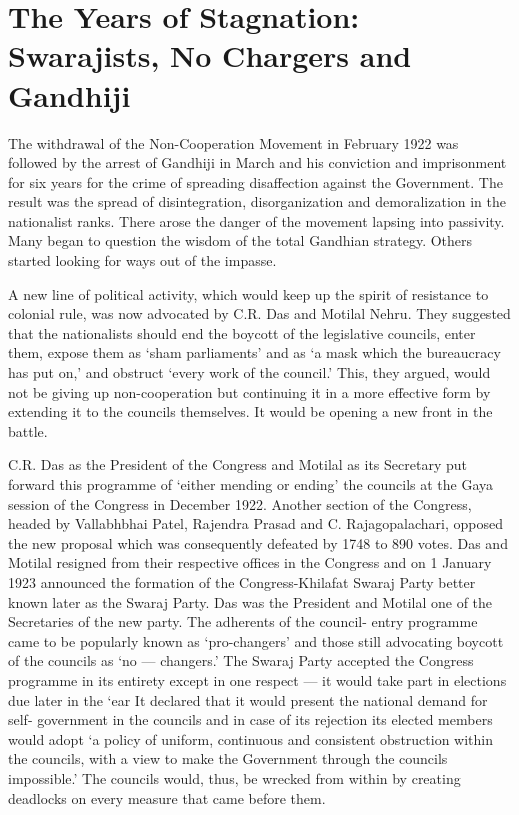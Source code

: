 \chapter[The Years of Stagnation]{The Years of Stagnation: Swarajists, No Chargers and Gandhiji}



The withdrawal of the Non-Cooperation Movement in February 1922 was followed by the arrest of Gandhiji in March and his conviction and imprisonment for six years for the crime of spreading disaffection against the Government. The result was the spread of disintegration, disorganization and demoralization in the nationalist ranks. There arose the danger of the movement lapsing into passivity. Many began to question the wisdom of the total Gandhian strategy. Others started looking for ways out of the impasse.

A new line of political activity, which would keep up the spirit of resistance to colonial rule, was now advocated by C.R. Das and Motilal Nehru. They suggested that the nationalists should end the boycott of the legislative councils, enter them, expose them as `sham parliaments' and as `a mask which the bureaucracy has put on,' and obstruct `every work of the council.' This, they argued, would not be giving up non-cooperation but continuing it in a more effective form by extending it to the councils themselves. It would be opening a new front in the battle.

C.R. Das as the President of the Congress and Motilal as its Secretary put forward this programme of `either mending or ending' the councils at the Gaya session of the Congress in December 1922. Another section of the Congress, headed by Vallabhbhai Patel, Rajendra Prasad and C. Rajagopalachari, opposed the new proposal which was consequently defeated by 1748 to 890 votes. Das and Motilal resigned from their respective offices in the Congress and on 1 January 1923 announced the formation of the Congress-Khilafat Swaraj Party better known later as the Swaraj Party. Das was the President and Motilal one of the Secretaries of the new party. The adherents of the council- entry programme came to be popularly known as `pro-changers' and those still advocating boycott of the councils as `no --- changers.' The Swaraj Party accepted the Congress programme in its entirety except in one respect --- it would take part in elections due later in the `ear It declared that it would present the national demand for self- government in the councils and in case of its rejection its elected members would adopt `a policy of uniform, continuous and consistent obstruction within the councils, with a view to make the Government through the councils impossible.' The councils would, thus, be wrecked from within by creating deadlocks on every measure that came before them.

